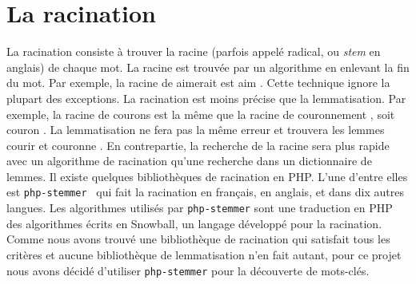 \section{La racination}
La racination consiste \`a trouver la racine (parfois appel\'e radical, ou \emph{stem} en anglais) de chaque mot.
La racine est trouv\'ee par un algorithme en enlevant la fin du mot.
Par exemple, la racine de \og aimerait \fg{} est \og aim \fg{}.
Cette technique ignore la plupart des exceptions.
La racination est moins pr\'ecise que la lemmatisation.
Par exemple, la racine de \og courons \fg{} est la m\^eme que la racine de \og couronnement \fg{}, soit \og couron \fg{}.
La lemmatisation ne fera pas la m\^eme erreur et trouvera les lemmes \og courir \fg{} et \og couronne \fg{}.
En contrepartie, la recherche de la racine sera plus rapide avec un algorithme de racination qu'une recherche dans un dictionnaire de lemmes.
Il existe quelques biblioth\`eques de racination en PHP.
L'une d'entre elles est \texttt{php-stemmer}~\cite{phpstemmer} qui fait la racination en fran\c{c}ais, en anglais, et dans dix autres langues.
Les algorithmes utilis\'es par \texttt{php-stemmer} sont une traduction en PHP des algorithmes \'ecrits en Snowball, un langage d\'evelopp\'e pour la racination.
Comme nous avons trouv\'e une biblioth\`eque de racination qui satisfait tous les crit\`eres et aucune biblioth\`eque de lemmatisation n'en fait autant, pour ce projet nous avons d\'ecid\'e d'utiliser \texttt{php-stemmer} pour la d\'ecouverte de mots-cl\'es.

